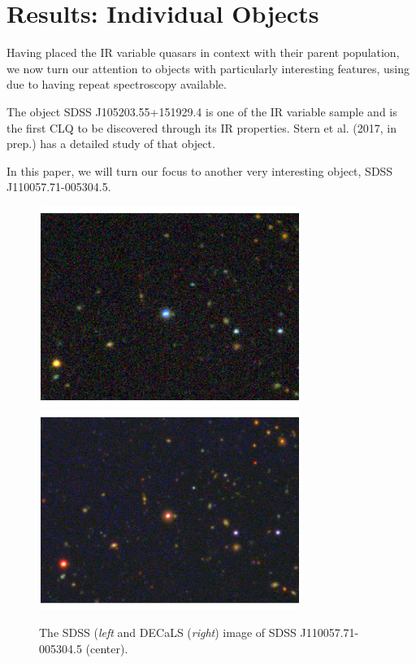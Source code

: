 \documentclass{emulateapj}
\begin{document}
\section{Results: Individual Objects}
Having placed the IR variable quasars in context with their parent 
population, we now turn our attention to objects with particularly interesting 
features, using due to having repeat spectroscopy available. 

The object SDSS J105203.55+151929.4 is one of the IR variable sample 
and is the first CLQ to be discovered through its IR properties. 
Stern et al. (2017, in prep.) has a detailed study of that object. 

In this paper, we will turn our focus to another very interesting object, 
SDSS J110057.71-005304.5. 

\begin{figure}
  \includegraphics[width=8.50cm, height=6.50cm, trim=0.0cm 0.0cm 0.0cm 0.0cm, clip]
  {../images/J110057_sdss_image_nolabels.pdf}
  \includegraphics[width=8.50cm, height=6.50cm, trim=0.0cm 0.0cm 0.0cm 0.0cm, clip]
  {../images/J110057_decals_image_nolabels.pdf}
  \centering
  \caption[]{The SDSS ({\it left} and DECaLS ({\it right}) image of SDSS J110057.71-005304.5 (center). } 
\label{fig:w1100m0052_sdss}
\end{figure}
\end{document}
